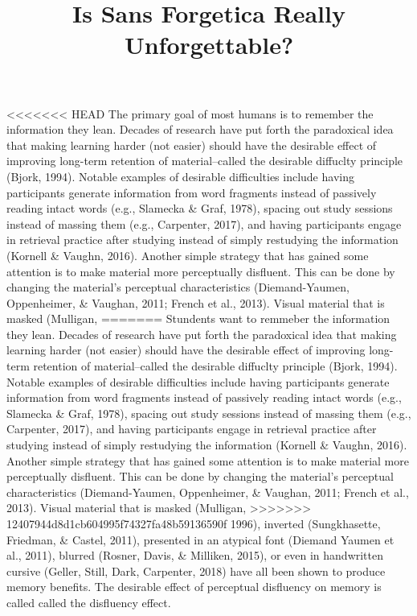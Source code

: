 \documentclass[]{article}
\title{Is Sans Forgetica Really Unforgettable?}
\author{}
\date{\vspace{-2.5em}}
\begin{document}
\maketitle

\textless{}\textless{}\textless{}\textless{}\textless{}\textless{}\textless{}
HEAD The primary goal of most humans is to remember the information they
lean. Decades of research have put forth the paradoxical idea that
making learning harder (not easier) should have the desirable effect of
improving long-term retention of material--called the desirable
diffuclty principle (Bjork, 1994). Notable examples of desirable
difficulties include having participants generate information from word
fragments instead of passively reading intact words (e.g., Slamecka \&
Graf, 1978), spacing out study sessions instead of massing them (e.g.,
Carpenter, 2017), and having participants engage in retrieval practice
after studying instead of simply restudying the information (Kornell \&
Vaughn, 2016). Another simple strategy that has gained some attention is
to make material more perceptually disfluent. This can be done by
changing the material's perceptual characteristics (Diemand-Yaumen,
Oppenheimer, \& Vaughan, 2011; French et al., 2013). Visual material
that is masked (Mulligan, ======= Stundents want to remmeber the
information they lean. Decades of research have put forth the
paradoxical idea that making learning harder (not easier) should have
the desirable effect of improving long-term retention of
material--called the desirable diffuclty principle (Bjork, 1994).
Notable examples of desirable difficulties include having participants
generate information from word fragments instead of passively reading
intact words (e.g., Slamecka \& Graf, 1978), spacing out study sessions
instead of massing them (e.g., Carpenter, 2017), and having participants
engage in retrieval practice after studying instead of simply restudying
the information (Kornell \& Vaughn, 2016). Another simple strategy that
has gained some attention is to make material more perceptually
disfluent. This can be done by changing the material's perceptual
characteristics (Diemand-Yaumen, Oppenheimer, \& Vaughan, 2011; French
et al., 2013). Visual material that is masked (Mulligan,
\textgreater{}\textgreater{}\textgreater{}\textgreater{}\textgreater{}\textgreater{}\textgreater{}
12407944d8d1cb604995f74327fa48b59136590f 1996), inverted (Sungkhasette,
Friedman, \& Castel, 2011), presented in an atypical font (Diemand
Yaumen et al., 2011), blurred (Rosner, Davis, \& Milliken, 2015), or
even in handwritten cursive (Geller, Still, Dark, Carpenter, 2018) have
all been shown to produce memory benefits. The desirable effect of
perceptual disfluency on memory is called called the disfluency effect.
\end{document}
